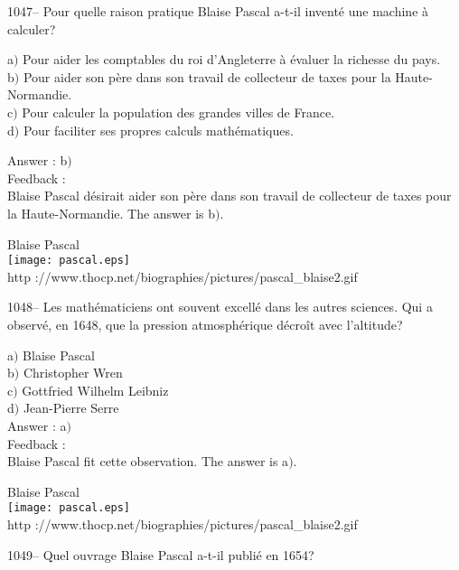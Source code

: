 \documentclass[letterpaper, 12pt]{article}
\begin{document}
1047-- Pour quelle raison pratique Blaise Pascal a-t-il invent\'e
une machine \`a calculer?

a$)$ Pour aider les comptables du roi d'Angleterre \`a \'evaluer la richesse
du pays.   \\
b$)$ Pour aider son p\`ere dans son travail de collecteur de taxes pour la
Haute-Normandie.  \\
c$)$ Pour calculer la population des grandes villes de France. \\
d$)$ Pour faciliter ses propres calculs math\'ematiques.

Answer : b$)$\\

Feedback : \\
Blaise Pascal d\'esirait aider son p\`ere dans son travail de
collecteur de taxes pour la Haute-Normandie.
The answer is b$)$.\\

        \begin{center}
        Blaise Pascal\\
    \texttt{[image: pascal.eps]}\\
        {\footnotesize http
://www.thocp.net/biographies/pictures/pascal\_blaise2.gif}
    \end{center}

1048-- Les math\'ematiciens ont souvent excell\'e dans les autres
sciences. Qui a observ\'e, en 1648, que la pression atmosph\'erique
d\'ecro\^it avec l'altitude?

a$)$ Blaise Pascal \\
b$)$ Christopher Wren   \\
c$)$ Gottfried Wilhelm Leibniz  \\
d$)$ Jean-Pierre Serre \\

Answer : a$)$\\

Feedback : \\
Blaise Pascal fit cette observation.
The answer is a$)$.\\

        \begin{center}
        Blaise Pascal\\
    \texttt{[image: pascal.eps]}\\
        {\footnotesize http
://www.thocp.net/biographies/pictures/pascal\_blaise2.gif}
    \end{center}

1049-- Quel ouvrage Blaise Pascal a-t-il publi\'e en 1654?
\end{document}
